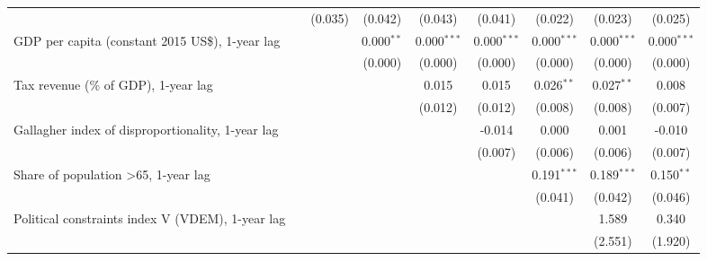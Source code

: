 \begin{table}[htbp]
\begin{tabular}{lcccccccc}
                                                                                  &                & (0.035)       & (0.042)       & (0.043)       & (0.041)       & (0.022)        & (0.023)        & (0.025)\\   
      GDP per capita (constant 2015 US\$), 1-year lag                             &                &               & 0.000$^{**}$  & 0.000$^{***}$ & 0.000$^{***}$ & 0.000$^{***}$  & 0.000$^{***}$  & 0.000$^{***}$\\   
                                                                                  &                &               & (0.000)       & (0.000)       & (0.000)       & (0.000)        & (0.000)        & (0.000)\\   
      Tax revenue (\% of GDP), 1-year lag                                         &                &               &               & 0.015         & 0.015         & 0.026$^{**}$   & 0.027$^{**}$   & 0.008\\   
                                                                                  &                &               &               & (0.012)       & (0.012)       & (0.008)        & (0.008)        & (0.007)\\   
      Gallagher index of disproportionality, 1-year lag                           &                &               &               &               & -0.014        & 0.000          & 0.001          & -0.010\\   
                                                                                  &                &               &               &               & (0.007)       & (0.006)        & (0.006)        & (0.007)\\   
      Share of population >65, 1-year lag                                         &                &               &               &               &               & 0.191$^{***}$  & 0.189$^{***}$  & 0.150$^{**}$\\   
                                                                                  &                &               &               &               &               & (0.041)        & (0.042)        & (0.046)\\   
      Political constraints index V (VDEM), 1-year lag                            &                &               &               &               &               &                & 1.589          & 0.340\\   
                                                                                  &                &               &               &               &               &                & (2.551)        & (1.920)\\   

\end{tabular}
\end{table}
